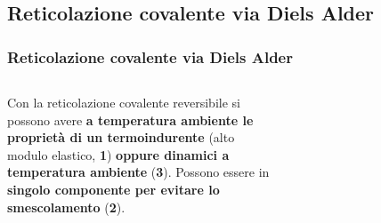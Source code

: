 \subsection{Reticolazione covalente via Diels Alder}
\begin{frame}\frametitle{Reticolazione covalente via Diels Alder}
\begin{columns}
Con la reticolazione covalente reversibile si possono avere \textbf{a temperatura ambiente le proprietà di un termoindurente} (alto modulo elastico, \textbf{1}) \textbf{oppure dinamici a temperatura ambiente} (\textbf{3}). Possono essere in \textbf{singolo componente per evitare lo smescolamento} (\textbf{2}).\vspace{25pt}
\vspace{-10pt}
\begin{figure}{}\end{figure}\vspace{-15pt}
\begin{figure}{}\end{figure}


\end{columns}
\end{frame}
